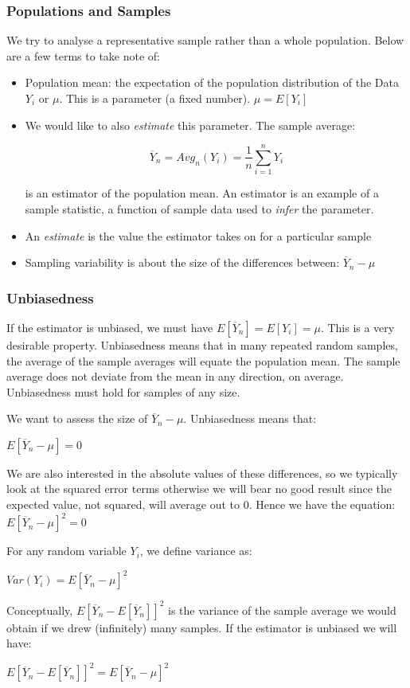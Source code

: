 \documentclass[12pt, letterpaper]{article}
\begin{document}
{\subsubsection{Populations and Samples}
We try to analyse a representative sample rather than a whole population. Below are a few terms to take note of:
\begin{itemize}
	\item Population mean: the expectation of the population distribution of the Data $Y_i$ or $\mu$. This is a parameter (a fixed number). $\mu = E[Y_i]$
	\item We would like to also \textit{estimate} this parameter. The sample average:
	\begin{center}
		$$\overline{Y}_n = Avg_n(Y_i) = \frac{1}{n}\sum^n_{i=1}Y_i$$
	\end{center}
	 is an estimator of the population mean. An estimator is an example of a sample statistic, a function of sample data used to \textit{infer} the parameter.
	\item An \textit{estimate} is the value the estimator takes on for a particular sample
	\item Sampling variability is about the size of the differences between: $\overline{Y}_n - \mu$
\end{itemize}

\subsubsection{Unbiasedness}
If the estimator is unbiased, we must have $E[\overline{Y}_n] = E[Y_i] = \mu$. This is a very desirable property. Unbiasedness means that in many repeated random samples, the average of the sample averages will equate the population mean. The sample average does not deviate from the mean in any direction, on average. Unbiasedness must hold for samples of any size.

\vspace{10pt}
\noindent We want to assess the size of $\overline{Y}_n - \mu$. Unbiasedness means that:
\begin{center}
	$E[\overline{Y}_n - \mu] = 0$
\end{center}
We are also interested in the absolute values of these differences, so we typically look at the squared error terms otherwise we will bear no good result since the expected value, not squared, will average out to 0. Hence we have the equation: $E[\overline{Y}_n - \mu]^2 = 0$

\vspace{10pt}
\noindent For any random variable $Y_i$, we define variance as:
\begin{center}
	$Var(Y_i) = E[\overline{Y}_n -\mu]^2$
\end{center}
Conceptually, $E[\overline{Y}_n - E[\overline{Y}_n]]^2$ is the variance of the sample average we would obtain if we drew (infinitely) many samples. If the estimator is unbiased we will have:
\begin{center}
	$E[\overline{Y}_n - E[\overline{Y}_n]]^2 = E[\overline{Y}_n -\mu]^2$
\end{center}

}
\end{document}
